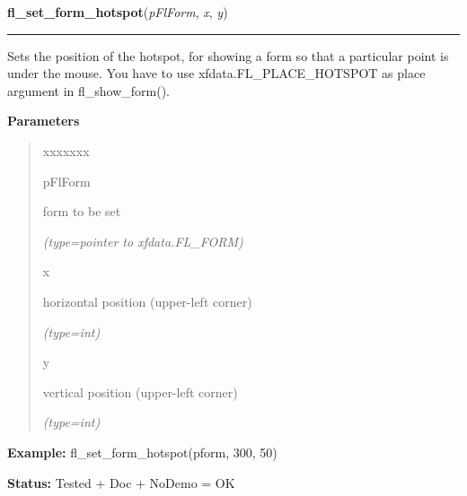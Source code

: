     \label{xformslib:flbasic:fl_set_form_hotspot}

    \vspace{0.5ex}

\hspace{.8\funcindent}\begin{boxedminipage}{\funcwidth}

    \raggedright \textbf{fl\_set\_form\_hotspot}(\textit{pFlForm}, \textit{x}, \textit{y})

    \vspace{-1.5ex}

    \rule{\textwidth}{0.5\fboxrule}
\setlength{\parskip}{2ex}
    Sets the position of the hotspot, for showing a form so that a 
    particular point is under the mouse. You have to use 
    xfdata.FL\_PLACE\_HOTSPOT as place argument in fl\_show\_form().

\setlength{\parskip}{1ex}
      \textbf{Parameters}
      \vspace{-1ex}

      \begin{quote}
        \begin{Ventry}{xxxxxxx}

          \item[pFlForm]

          form to be set

            {\it (type=pointer to xfdata.FL\_FORM)}

          \item[x]

          horizontal position (upper-left corner)

            {\it (type=int)}

          \item[y]

          vertical position (upper-left corner)

            {\it (type=int)}

        \end{Ventry}

      \end{quote}

\textbf{Example:} fl\_set\_form\_hotspot(pform, 300, 50)



\textbf{Status:} Tested + Doc + NoDemo = OK



    \end{boxedminipage}

